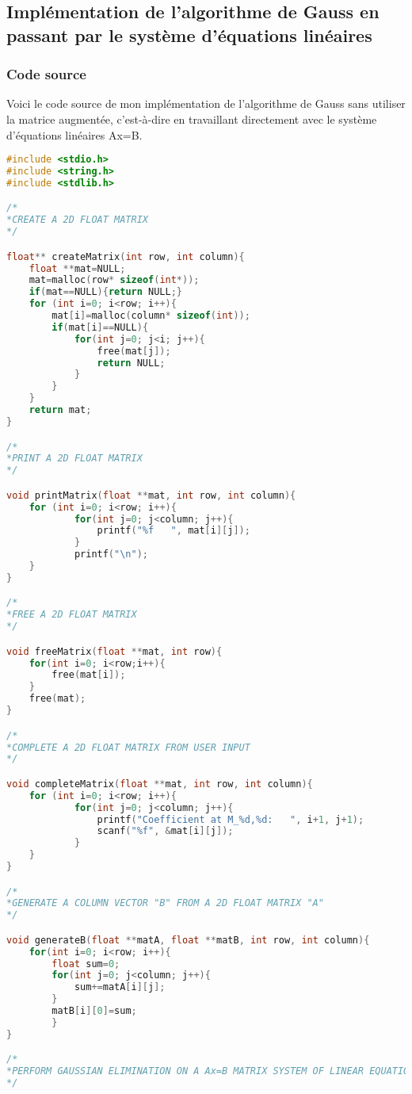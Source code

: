 \documentclass{report}
\begin{document}
\subsection{Implémentation de l'algorithme de Gauss en passant par le système d'équations linéaires}
\subsubsection{Code source}
Voici le code source de mon implémentation de l'algorithme de Gauss sans utiliser la matrice augmentée, c'est-à-dire en travaillant directement avec le système d'équations linéaires Ax=B.\\
\begin{lstlisting}[language=C,inputencoding=utf8]
#include <stdio.h>
#include <string.h>
#include <stdlib.h>

/*
*CREATE A 2D FLOAT MATRIX
*/

float** createMatrix(int row, int column){
	float **mat=NULL;
	mat=malloc(row* sizeof(int*));
	if(mat==NULL){return NULL;}
	for (int i=0; i<row; i++){
		mat[i]=malloc(column* sizeof(int));
		if(mat[i]==NULL){
			for(int j=0; j<i; j++){
				free(mat[j]);
				return NULL;
			}
		}
	}
	return mat;
}

/*
*PRINT A 2D FLOAT MATRIX
*/

void printMatrix(float **mat, int row, int column){
	for (int i=0; i<row; i++){
    		for(int j=0; j<column; j++){
         		printf("%f   ", mat[i][j]);
    		}
    		printf("\n");
	}
}

/*
*FREE A 2D FLOAT MATRIX
*/

void freeMatrix(float **mat, int row){
	for(int i=0; i<row;i++){
		free(mat[i]);
	}
	free(mat);
}

/*
*COMPLETE A 2D FLOAT MATRIX FROM USER INPUT
*/

void completeMatrix(float **mat, int row, int column){
	for (int i=0; i<row; i++){
    		for(int j=0; j<column; j++){
    			printf("Coefficient at M_%d,%d:   ", i+1, j+1);
         		scanf("%f", &mat[i][j]);
    		}
	}
}

/*
*GENERATE A COLUMN VECTOR "B" FROM A 2D FLOAT MATRIX "A"
*/

void generateB(float **matA, float **matB, int row, int column){
	for(int i=0; i<row; i++){
		float sum=0;
		for(int j=0; j<column; j++){
			sum+=matA[i][j];
		}
		matB[i][0]=sum;
    	}
}

/*
*PERFORM GAUSSIAN ELIMINATION ON A Ax=B MATRIX SYSTEM OF LINEAR EQUATIONS
*/


\end{lstlisting}
\end{document}
